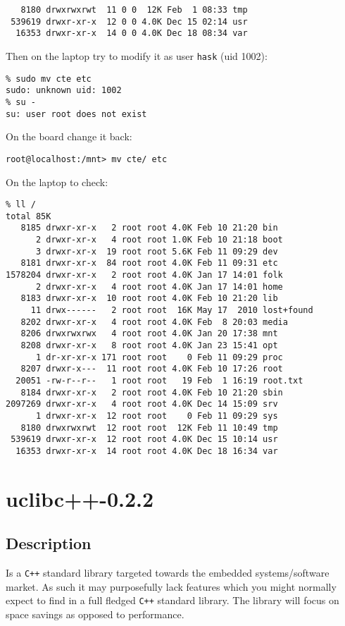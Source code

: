 \documentclass[a4paper]{report}
\begin{document}
\begin{enumerate}
\begin{lstlisting}
   8180 drwxrwxrwt  11 0 0  12K Feb  1 08:33 tmp
 539619 drwxr-xr-x  12 0 0 4.0K Dec 15 02:14 usr
  16353 drwxr-xr-x  14 0 0 4.0K Dec 18 08:34 var
\end{lstlisting}
Then on the laptop try to modify it as user {\tt hask} (uid 1002):
\begin{lstlisting}
% sudo mv cte etc
sudo: unknown uid: 1002
% su -
su: user root does not exist
\end{lstlisting}
On the board change it back:
\begin{lstlisting}
root@localhost:/mnt> mv cte/ etc
\end{lstlisting}
On the laptop to check:
\begin{lstlisting}
% ll /
total 85K
   8185 drwxr-xr-x   2 root root 4.0K Feb 10 21:20 bin
      2 drwxr-xr-x   4 root root 1.0K Feb 10 21:18 boot
      3 drwxr-xr-x  19 root root 5.6K Feb 11 09:29 dev
   8181 drwxr-xr-x  84 root root 4.0K Feb 11 09:31 etc
1578204 drwxr-xr-x   2 root root 4.0K Jan 17 14:01 folk
      2 drwxr-xr-x   4 root root 4.0K Jan 17 14:01 home
   8183 drwxr-xr-x  10 root root 4.0K Feb 10 21:20 lib
     11 drwx------   2 root root  16K May 17  2010 lost+found
   8202 drwxr-xr-x   4 root root 4.0K Feb  8 20:03 media
   8206 drwxrwxrwx   4 root root 4.0K Jan 20 17:38 mnt
   8208 drwxr-xr-x   8 root root 4.0K Jan 23 15:41 opt
      1 dr-xr-xr-x 171 root root    0 Feb 11 09:29 proc
   8207 drwxr-x---  11 root root 4.0K Feb 10 17:26 root
  20051 -rw-r--r--   1 root root   19 Feb  1 16:19 root.txt
   8184 drwxr-xr-x   2 root root 4.0K Feb 10 21:20 sbin
2097269 drwxr-xr-x   4 root root 4.0K Dec 14 15:09 srv
      1 drwxr-xr-x  12 root root    0 Feb 11 09:29 sys
   8180 drwxrwxrwt  12 root root  12K Feb 11 10:49 tmp
 539619 drwxr-xr-x  12 root root 4.0K Dec 15 10:14 usr
  16353 drwxr-xr-x  14 root root 4.0K Dec 18 16:34 var
\end{lstlisting}


\chapter{uclibc++-0.2.2}
\section{Description}
Is a {\tt C++} standard library targeted towards the embedded systems/software market. 
As such it may purposefully lack features which you might normally expect to find in 
a full fledged {\tt C++} standard library. The library will focus on space savings as 
opposed to performance.

\end{enumerate}
\end{document}
